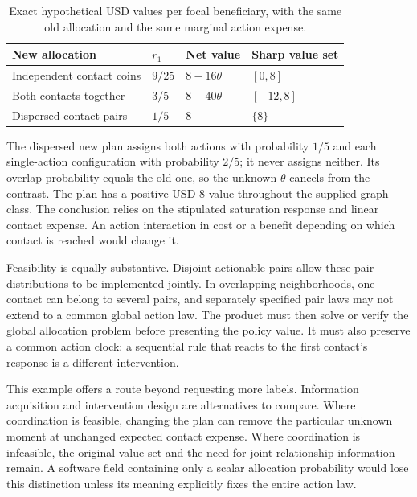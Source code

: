 \begin{table}[htbp]
\centering\small
\begin{tabular}{p{}p{}p{}p{}}
\toprule
New allocation & $r_1$ & Net value & Sharp value set\\
\midrule
Independent contact coins & $9/25$ & $8-16\theta$ & $[0,8]$\\
Both contacts together & $3/5$ & $8-40\theta$ & $[-12,8]$\\
Dispersed contact pairs & $1/5$ & $8$ & $\{8\}$\\
\bottomrule
\end{tabular}
\caption{Exact hypothetical USD values per focal beneficiary, with the same
old allocation and the same marginal action expense.}
\label{exec17:s7-policy-table}
\end{table}

The dispersed new plan assigns both actions with probability $1/5$ and each
single-action configuration with probability $2/5$; it never assigns neither.
Its overlap probability equals the old one, so the unknown $\theta$ cancels
from the contrast. The plan has a positive USD 8 value throughout the supplied
graph class. The conclusion relies on the stipulated saturation response and
linear contact expense. An action interaction in cost or a benefit depending
on which contact is reached would change it.~\citep{exec17_s7_math}

Feasibility is equally substantive. Disjoint actionable pairs allow these
pair distributions to be implemented jointly. In overlapping neighborhoods,
one contact can belong to several pairs, and separately specified pair laws
may not extend to a common global action law. The product must then solve or
verify the global allocation problem before presenting the policy value.
It must also preserve a common action clock: a sequential rule that reacts
to the first contact's response is a different intervention.

This example offers a route beyond requesting more labels. Information
acquisition and intervention design are alternatives to compare. Where
coordination is feasible, changing the plan can remove the particular unknown
moment at unchanged expected contact expense. Where coordination is infeasible,
the original value set and the need for joint relationship information remain.
A software field containing only a scalar allocation probability would lose
this distinction unless its meaning explicitly fixes the entire action law.

